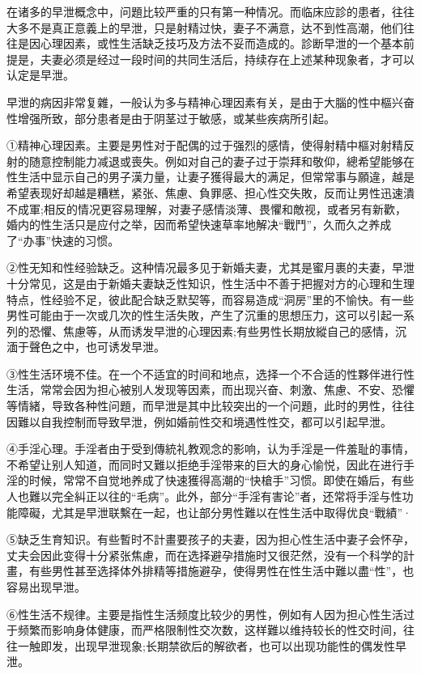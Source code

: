 \documentclass[12pt,UTF8]{ctexbook}
\begin{document}
在诸多的早泄概念中，问題比较严重的只有第一种情况。而临床应診的患者，往往大多不是真正意義上的早泄，只是射精过快，妻子不满意，达不到性高潮，他们往往是因心理因素，或性生活缺乏技巧及方法不妥而造成的。診断早泄的一个基本前提是，夫妻必须是经过一段时间的共同生活后，持续存在上述某种现象者，才可以认定是早泄。

早泄的病因非常复雜，一般认为多与精神心理因素有关，是由于大腦的性中樞兴奋性增强所致，部分患者是由于阴茎过于敏感，或某些疾病所引起。

①精神心理因素。主要是男性对于配偶的过于强烈的感情，使得射精中樞对射精反射的随意控制能力减退或喪失。例如对自己的妻子过于崇拜和敬仰，總希望能够在性生活中显示自己的男子漢力量，让妻子獲得最大的满足，但常常事与願違，越是希望表现好却越是糟糕，紧张、焦慮、負罪感、担心性交失敗，反而让男性迅速潰不成軍;相反的情况更容易理解，对妻子感情淡薄、畏懼和敵视，或者另有新歡，婚内的性生活只是应付之举，因而希望快速草率地解决“戰鬥”，久而久之养成了“办事”快速的习惯。

②性无知和性经验缺乏。这种情况最多见于新婚夫妻，尤其是蜜月裹的夫妻，早泄十分常见，这是由于新婚夫妻缺乏性知识，性生活中不善于把握对方的心理和生理特点，性经验不足，彼此配合缺乏默契等，而容易造成“洞房”里的不愉快。有一些男性可能由于一次或几次的性生活失敗，产生了沉重的思想压力，这可以引起一系列的恐懼、焦慮等，从而诱发早泄的心理因素;有些男性长期放縱自己的感情，沉湎于聲色之中，也可诱发早泄。

③性生活环境不佳。在一个不适宜的时间和地点，选择一个不合适的性夥伴进行性生活，常常会因为担心被别人发现等因素，而出现兴奋、刺激、焦慮、不安、恐懼等情緒，导致各种性问題，而早泄是其中比较突出的一个问題，此时的男性，往往因難以自我控制而导致早泄，例如婚前性交和境遇性性交，都可以引起早泄。

④手淫心理。手淫者由于受到傳統礼教观念的影响，认为手淫是一件羞耻的事情，不希望让别人知道，而同时又難以拒绝手淫带来的巨大的身心愉悦，因此在进行手淫的时候，常常不自觉地养成了快速獲得高潮的“快槍手”习惯。即使在婚后，有些人也難以完全糾正以往的“毛病”。此外，部分“手淫有害论”者，还常将手淫与性功能障礙，尤其是早泄联繫在一起，也让部分男性難以在性生活中取得优良“戰績”·

⑤缺乏生育知识。有些暫时不計畫要孩子的夫妻，因为担心性生活中妻子会怀孕，丈夫会因此变得十分紧张焦慮，而在选择避孕措施时又很茫然，没有一个科学的計畫，有些男性甚至选择体外排精等措施避孕，使得男性在性生活中難以盡“性”，也容易出现早泄。

⑥性生活不规律。主要是指性生活频度比较少的男性，例如有人因为担心性生活过于频繁而影响身体健康，而严格限制性交次数，这样難以维持较长的性交时间，往往一触即发，出现早泄现象;长期禁欲后的解欲者，也可以出现功能性的偶发性早泄。
\end{document}
